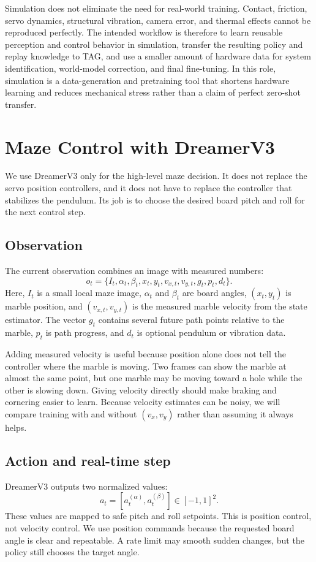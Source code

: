 \documentclass[9pt]{extarticle}
\begin{document}
Simulation does not eliminate the need for real-world training. Contact, friction, servo dynamics, structural vibration, camera error, and thermal effects cannot be reproduced perfectly. The intended workflow is therefore to learn reusable perception and control behavior in simulation, transfer the resulting policy and replay knowledge to TAG, and use a smaller amount of hardware data for system identification, world-model correction, and final fine-tuning. In this role, simulation is a data-generation and pretraining tool that shortens hardware learning and reduces mechanical stress rather than a claim of perfect zero-shot transfer.

\section{Maze Control with DreamerV3}
We use DreamerV3 only for the high-level maze decision. It does not replace the servo position controllers, and it does not have to replace the controller that stabilizes the pendulum. Its job is to choose the desired board pitch and roll for the next control step.

\subsection{Observation}
The current observation combines an image with measured numbers:
\begin{equation}
 o_t=\{I_t,\alpha_t,\beta_t,x_t,y_t,v_{x,t},v_{y,t},g_t,p_t,d_t\}.
\end{equation}
Here, $I_t$ is a small local maze image, $\alpha_t$ and $\beta_t$ are board angles, $(x_t,y_t)$ is marble position, and $(v_{x,t},v_{y,t})$ is the measured marble velocity from the state estimator. The vector $g_t$ contains several future path points relative to the marble, $p_t$ is path progress, and $d_t$ is optional pendulum or vibration data.

Adding measured velocity is useful because position alone does not tell the controller where the marble is moving. Two frames can show the marble at almost the same point, but one marble may be moving toward a hole while the other is slowing down. Giving velocity directly should make braking and cornering easier to learn. Because velocity estimates can be noisy, we will compare training with and without $(v_x,v_y)$ rather than assuming it always helps.

\subsection{Action and real-time step}
DreamerV3 outputs two normalized values:
\begin{equation}
 a_t=[a_t^{(\alpha)},a_t^{(\beta)}]\in[-1,1]^2.
\end{equation}
These values are mapped to safe pitch and roll setpoints. This is position control, not velocity control. We use position commands because the requested board angle is clear and repeatable. A rate limit may smooth sudden changes, but the policy still chooses the target angle.
\end{document}
